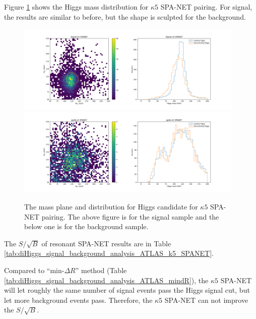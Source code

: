 \documentclass[12pt]{article}
\begin{document}
		Figure \ref{fig:Higgs_mass_new_k5_SPANET} shows the Higgs mass distribution for $\kappa 5$ SPA-NET pairing. For signal, the results are similar to before, but the shape is sculpted for the background.
		\begin{figure}[htpb]
			\centering
			\includegraphics[width=0.97\textwidth]{Higgs_mass_new_k5-SPANET_s.png}
			\includegraphics[width=0.97\textwidth]{Higgs_mass_new_k5-SPANET_4b.png}
			\caption{The mass plane and distribution for Higgs candidate for $\kappa 5$ SPA-NET pairing. The above figure is for the signal sample and the below one is for the background sample.}
			\label{fig:Higgs_mass_new_k5_SPANET}
		\end{figure}

		The $S / \sqrt{B}$ of resonant SPA-NET results are in Table \ref{tab:diHiggs_signal_background_analysis_ATLAS_k5_SPANET}.

		Compared to ``$\text{min-}\Delta R$'' method (Table \ref{tab:diHiggs_signal_background_analysis_ATLAS_mindR}), the $\kappa 5$ SPA-NET will let roughly the same number of signal events pass the Higgs signal cut, but let more background events pass. Therefore, the $\kappa 5$ SPA-NET can not improve the $S/\sqrt{B}$.
\end{document}
